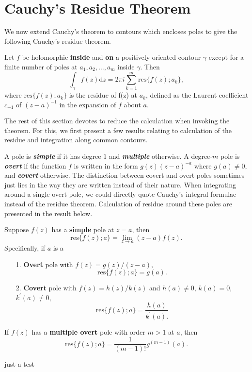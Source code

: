 \documentclass{article}
\begin{document}
\section{Cauchy's Residue Theorem}
We now extend Cauchy's theorem to contours which encloses poles to give the following Cauchy's residue theorem. 
\begin{frm-thm}
    Let $f$ be holomorphic \textbf{inside} and \textbf{on} a positively oriented contour $\gamma $ except for a finite number of poles at $a_1, a_2, \ldots , a_m $ inside $\gamma $. Then
    \[
        \int_\gamma f(z) \mathrm{d}z = 2 \pi i \sum\limits_{k=1}^{m} \mathrm{res}\{f(z);  a_k\},
    \]
    where $\mathrm{res}\{f(z); a_k\}$ is the residue of f(z) at $a_k$, defined as the Laurent coefficient $c_{-1}$ of $(z-a)^{-1} $ in the expansion of $f$ about $a$. 
\end{frm-thm}
The rest of this section devotes to reduce the calculation when invoking the theorem. For this, we first present a few results relating to calculation of the residue and integration along common contours. 

A pole is \textit{\textbf{simple}} if it has degree $1$ and \textit{\textbf{multiple}} otherwise. A degree-$m$ pole is \textit{\textbf{overt}} if the function $f$ is written in the form $g(z)(z-a)^{-a} $ where $g(a) \neq  0$, and \textit{\textbf{covert}} otherwise. The distinction between covert and overt poles sometimes just lies in the way they are written instead of their nature. When integrating around a single overt pole, we could directly quote Cauchy's integral formulae instead of the residue theorem. Calculation of residue around these poles are presented in the result below. 
\begin{frm-res}
    Suppose $f(z)$ has a \textbf{simple}  pole at $z=a$, then 
    \[
        \mathrm{res} \{f(z); a \} = \lim\limits_{z \to a} (z-a) f(z). 
    \]
    Specifically, if $a$ is a 
    \begin{itemize}
        \item[1.] \textbf{Overt} pole with $f(z)=g(z) / (z-a),$ \[\mathrm{res} \{f(z); a \} = g(a).\]
        \item[2.] \textbf{Covert} pole with $f(z) = h(z)/k(z)$ and $h(a) \neq 0$, $k(a)=0$, $k^\prime (a) \neq 0$, 
        \[
            \mathrm{res} \{f(z); a \} = \frac{h(a)}{k^\prime (a).}
        \]
    \end{itemize}
\end{frm-res}

\begin{frm-res}
    If $f(z)$ has a \textbf{multiple overt} pole with order $m>1$ at $a$, then 
    \[
        \mathrm{res} \{f(z); a \} = \frac{1}{(m-1)!}g^{(m-1)}(a).
    \]
\end{frm-res}
just a test 
\end{document}

